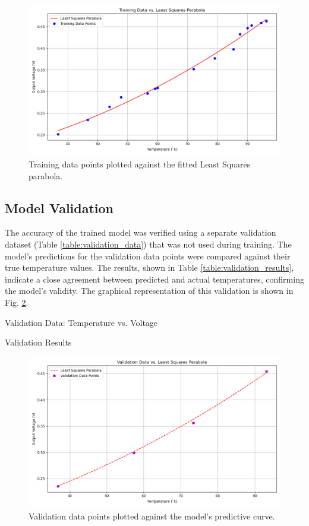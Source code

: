 \documentclass[conference]{IEEEtran}
\begin{document}
\begin{figure}[!h]
    \centering
    \includegraphics[width=0.9\columnwidth]{figs/training_data.png}
    \caption{Training data points plotted against the fitted Least Squares parabola.}
    \label{fig:training_plot}
\end{figure}

\subsection{Model Validation}
The accuracy of the trained model was verified using a separate validation dataset (Table \ref{table:validation_data}) that was not used during training. The model's predictions for the validation data points were compared against their true temperature values. The results, shown in Table \ref{table:validation_results}, indicate a close agreement between predicted and actual temperatures, confirming the model's validity. The graphical representation of this validation is shown in Fig. \ref{fig:validation_plot}.

\begin{table}[!h]
  \centering
  \caption{Validation Data: Temperature vs. Voltage}
  \label{table:validation_data}
  
\end{table}

\begin{table}[!h]
  \centering
  \caption{Validation Results}
  \label{table:validation_results}
  
\end{table}

\begin{figure}[!h]
    \centering
    \includegraphics[width=0.9\columnwidth]{figs/validation_data.png}
    \caption{Validation data points plotted against the model's predictive curve.}
    \label{fig:validation_plot}
\end{figure}
\end{document}
